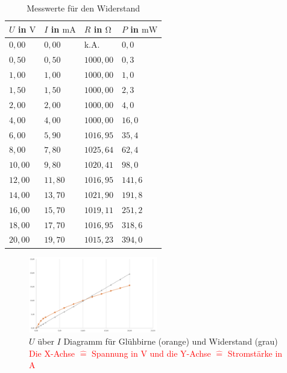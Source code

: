         \begin{table}[H]
            \centering
            \begin{tabular}{|l|l|l|l|}
                \hline
                $U$ in $\mathrm{V}$ & $I$ in $\mathrm{mA}$ & $R$ in $\mathrm{\Omega}$ & $P$ in $\mathrm{mW}$\\
                \hline\hline
                $0,00$ & $0,00$ & k.A. & $0,0$\\
                \hline
                $0,50$ & $0,50$ & $1000,00$ & $0,3$\\
                \hline
                $1,00$ & $1,00$ & $1000,00$ & $1,0$\\
                \hline
                $1,50$ & $1,50$ & $1000,00$ & $2,3$\\
                \hline
                $2,00$ & $2,00$ & $1000,00$ & $4,0$\\
                \hline
                $4,00$ & $4,00$ & $1000,00$ & $16,0$\\
                \hline
                $6,00$ & $5,90$ & $1016,95$ & $35,4$\\
                \hline
                $8,00$ & $7,80$ & $1025,64$ & $62,4$\\
                \hline
                $10,00$ & $9,80$ & $1020,41$ & $98,0$\\
                \hline
                $12,00$ & $11,80$ & $1016,95$ & $141,6$\\
                \hline
                $14,00$ & $13,70$ & $1021,90$ & $191,8$\\
                \hline
                $16,00$ & $15,70$ & $1019,11$ & $251,2$\\
                \hline
                $18,00$ & $17,70$ & $1016,95$ & $318,6$\\
                \hline
                $20,00$ & $19,70$ & $1015,23$ & $394,0$\\
                \hline
            \end{tabular}
            \caption{Messwerte für den Widerstand}
            \label{tab:widerstand}
        \end{table}

        \begin{figure}[H]
            \centering
            \includegraphics[width=0.5\textwidth]{bilder/Physik_02.png}
            \caption{$U$ über $I$ Diagramm für Glühbirne (orange) und Widerstand (grau)\\ \textcolor{red}{Die X-Achse $\hat{=}$ Spannung in V und die Y-Achse $\hat{=}$ Stromstärke in A}}
            \label{fig:wertev1}
        \end{figure}

